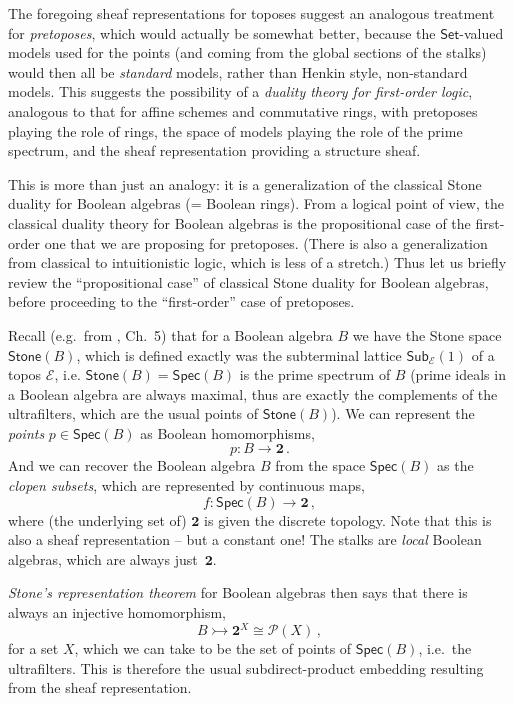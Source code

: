 \documentclass[graybox]{svmult}
\newcommand{\EE}{\ensuremath{\mathcal{E}}}
\newcommand{\Set}{\ensuremath{\mathsf{Set}}}
\newcommand{\mono}{\ensuremath{\rightarrowtail}}
\begin{document}
The foregoing sheaf representations for toposes suggest an analogous treatment for \emph{pretoposes}, which would actually be somewhat better, because the $\Set$-valued models used for the points (and coming from the global sections of the stalks) would then all be \emph{standard} models, rather than Henkin style, non-standard models. This suggests the possibility of a \emph{duality theory for first-order logic}, analogous to that for affine schemes and commutative rings, with  pretoposes playing the role of rings, the space of models playing the role of the prime spectrum, and the sheaf representation providing a structure sheaf.

This is more than just an analogy: it is a generalization of the classical Stone duality for Boolean algebras (= Boolean rings). From a logical point of view, the classical duality theory for Boolean algebras is the propositional case of the first-order one that we are proposing for pretoposes.  (There is also a generalization from classical to intuitionistic logic, which is less of a stretch.)  Thus let us briefly review the ``propositional case'' of classical Stone duality for Boolean algebras, before proceeding to the ``first-order'' case of pretoposes.  

Recall (e.g.\ from \cite{J}, Ch.~5) that for a Boolean algebra $B$ we have the Stone space $\mathsf{Stone}(B)$, which is defined exactly was the subterminal lattice $\mathsf{Sub}_{\EE}(1)$ of a topos $\EE$, i.e. $\mathsf{Stone}(B)=\mathsf{Spec}(B)$ is the prime spectrum of $B$ (prime ideals in a Boolean algebra are always maximal, thus are exactly the complements of the ultrafilters, which are the usual points of $\mathsf{Stone}(B)$).  We can represent the \emph{points} $p\in \mathsf{Spec}(B)$ as Boolean homomorphisms,
\[
p : B\to \mathbf{2}\,.
\]
And we can recover the Boolean algebra $B$ from the space $\mathsf{Spec}(B)$ as the \emph{clopen subsets}, which are represented by continuous maps,
\[
f : \mathsf{Spec}(B)\to \mathbf{2}\,,
\]
where (the underlying set of) $\mathbf{2}$ is given the discrete topology. Note that this is also a sheaf representation -- but a constant one!  The stalks are  \emph{local} Boolean algebras, which are always just~$\mathbf{2}$.  

\emph{Stone's representation theorem} for Boolean algebras then says that there is always an injective homomorphism,
\[
B \mono \mathbf{2}^X \cong \mathcal{P}(X)\,,
\]
for a set $X$, which we can take to be the set of points of $\mathsf{Spec}(B)$, i.e.\ the ultrafilters.  This is therefore the usual subdirect-product embedding resulting from the sheaf representation.
\end{document}

